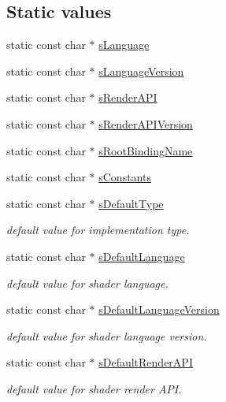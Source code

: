 \subsection*{Static values}
\begin{DoxyCompactItemize}
\item 
static const char $\ast$ \hyperlink{class_fbx_implementation_a41bf4828ad34699046cf66d915a9a01b}{s\+Language}
\item 
static const char $\ast$ \hyperlink{class_fbx_implementation_aef3358d9d9f6e48d7d1f806ec7999298}{s\+Language\+Version}
\item 
static const char $\ast$ \hyperlink{class_fbx_implementation_a6c5b03fd6433bbe70f3cd1868d52fdd1}{s\+Render\+A\+PI}
\item 
static const char $\ast$ \hyperlink{class_fbx_implementation_aa1ca5cd4df0e11b8f3df06eeb6650627}{s\+Render\+A\+P\+I\+Version}
\item 
static const char $\ast$ \hyperlink{class_fbx_implementation_a9590713869bf7ee6b320ff49df12e5e5}{s\+Root\+Binding\+Name}
\item 
static const char $\ast$ \hyperlink{class_fbx_implementation_a16188a40d70a73622c093ba3143fedac}{s\+Constants}
\item 
static const char $\ast$ \hyperlink{class_fbx_implementation_a69479c45473cfe7ad7dc66a3fdf39c23}{s\+Default\+Type}
\begin{DoxyCompactList}\small\item\em default value for implementation type. \end{DoxyCompactList}\item 
static const char $\ast$ \hyperlink{class_fbx_implementation_a41d0841fb6321eb5a01447e7effde11f}{s\+Default\+Language}
\begin{DoxyCompactList}\small\item\em default value for shader language. \end{DoxyCompactList}\item 
static const char $\ast$ \hyperlink{class_fbx_implementation_ac2aab3ea236712a7884780d6a8b4dbd7}{s\+Default\+Language\+Version}
\begin{DoxyCompactList}\small\item\em default value for shader language version. \end{DoxyCompactList}\item 
static const char $\ast$ \hyperlink{class_fbx_implementation_a8b6d58d53aab505dfee054b60333f14b}{s\+Default\+Render\+A\+PI}
\begin{DoxyCompactList}\small\item\em default value for shader render A\+PI. \end{DoxyCompactList}\item 

\end{DoxyCompactItemize}
